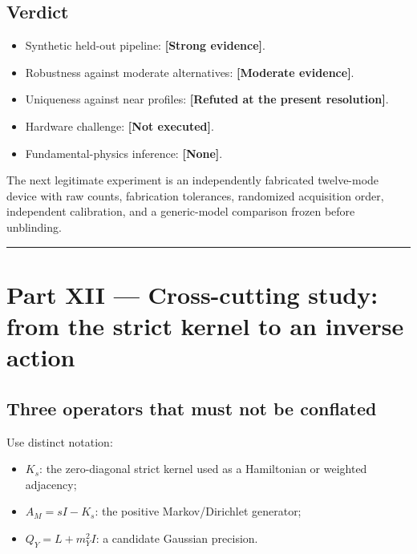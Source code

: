 \documentclass[11pt,a4paper,openany]{report}
\newcommand{\statusStrong}{\textcolor{finblue}{[Strong evidence]}}
\newcommand{\statusModerate}{\textcolor{finviolet}{[Moderate evidence]}}
\begin{document}
\section{Verdict}

\begin{itemize}
\item 
Synthetic held-out pipeline: \textbf{\statusStrong{}}.

\item 
Robustness against moderate alternatives: \textbf{\statusModerate{}}.

\item 
Uniqueness against near profiles: \textbf{[Refuted at the present resolution]}.

\item 
Hardware challenge: \textbf{[Not executed]}.

\item 
Fundamental-physics inference: \textbf{[None]}.

\end{itemize}

The next legitimate experiment is an independently fabricated twelve-mode device with raw counts, fabrication tolerances, randomized acquisition order, independent calibration, and a generic-model comparison frozen before unblinding.

\par\medskip\hrule\medskip

\chapter{Part XII — Cross-cutting study: from the strict kernel to an inverse action}

\section{Three operators that must not be conflated}

Use distinct notation:

\begin{itemize}
\item 
\(K_s\): the zero-diagonal strict kernel used as a Hamiltonian or weighted adjacency;

\item 
\(A_M=sI-K_s\): the positive Markov/\allowbreak{}Dirichlet generator;

\item 
\(Q_Y=L+m_Y^2I\): a candidate Gaussian precision.

\end{itemize}
\end{document}
